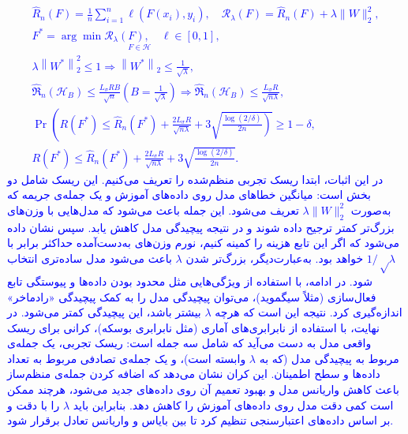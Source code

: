 \documentclass[12pt]{article}
\begin{document}
\begin{enumerate}
    \textcolor{blue}{
    $$
        \begin{gathered}
        \hat{R}_n(F)=\frac{1}{n} \sum_{i=1}^n \ell\left(F\left(x_i\right), y_i\right), \quad \mathcal{R}_\lambda(F)=\hat{R}_n(F)+\lambda\|W\|_2^2, \\
        F^*=\underset{F \in \mathcal{H}}{\arg \min \mathcal{R}_\lambda(F), \quad \ell \in[0,1],} \\
        \lambda\left\|W^*\right\|_2^2 \leq 1 \Rightarrow\left\|W^*\right\|_2 \leq \frac{1}{\sqrt{\lambda}}, \\
        \widehat{\Re}_n\left(\mathcal{H}_B\right) \leq \frac{L_\sigma R B}{\sqrt{n}}\left(B=\frac{1}{\sqrt{\lambda}}\right) \Rightarrow \widehat{\Re}_n\left(\mathcal{H}_B\right) \leq \frac{L_\sigma R}{\sqrt{n \lambda}}, \\
        \operatorname{Pr}\left(R\left(F^*\right) \leq \hat{R}_n\left(F^*\right)+\frac{2 L_\sigma R}{\sqrt{n \lambda}}+3 \sqrt{\left.\frac{\log (2 / \delta)}{2 n}\right)} \geq 1-\delta,\right. \\
        R\left(F^*\right) \leq \hat{R}_n\left(F^*\right)+\frac{2 L_\sigma R}{\sqrt{n \lambda}}+3 \sqrt{\frac{\log (2 / \delta)}{2 n}} .
        \end{gathered}
    $$
    }
    \textcolor{blue}{
    در این اثبات، ابتدا ریسک تجربی منظم‌شده را تعریف می‌کنیم. این ریسک شامل دو بخش است: میانگین خطاهای مدل روی داده‌های آموزش و یک جمله‌ی جریمه که به‌صورت $\lambda\|W\|_2^2$ تعریف می‌شود. این جمله باعث می‌شود که مدل‌هایی با وزن‌های بزرگ‌تر کمتر ترجیح داده شوند و در نتیجه پیچیدگی مدل کاهش یابد.
    سپس نشان داده می‌شود که اگر این تابع هزینه را کمینه کنیم، نورم وزن‌های به‌دست‌آمده حداکثر برابر با $1/√\lambda$ خواهد بود. به‌عبارت‌دیگر، بزرگ‌تر شدن $\lambda$ باعث می‌شود مدل ساده‌تری انتخاب شود.
    در ادامه، با استفاده از ویژگی‌هایی مثل محدود بودن داده‌ها و پیوستگی تابع فعال‌سازی (مثلاً سیگموید)، می‌توان پیچیدگی مدل را به کمک پیچیدگی «رادماخر» اندازه‌گیری کرد. نتیجه این است که هرچه $\lambda$ بیشتر باشد، این پیچیدگی کمتر می‌شود.
    در نهایت، با استفاده از نابرابری‌های آماری (مثل نابرابری بوسکه)، کرانی برای ریسک واقعی مدل به دست می‌آید که شامل سه جمله است: ریسک تجربی، یک جمله‌ی مربوط به پیچیدگی مدل (که به $\lambda$ وابسته است)، و یک جمله‌ی تصادفی مربوط به تعداد داده‌ها و سطح اطمینان. این کران نشان می‌دهد که اضافه کردن جمله‌ی منظم‌ساز باعث کاهش واریانس مدل و بهبود تعمیم آن روی داده‌های جدید می‌شود، هرچند ممکن است کمی دقت مدل روی داده‌های آموزش را کاهش دهد. بنابراین باید $\lambda$ را با دقت و بر اساس داده‌های اعتبارسنجی تنظیم کرد تا بین بایاس و واریانس تعادل برقرار شود.}



\end{enumerate}
\end{document}
